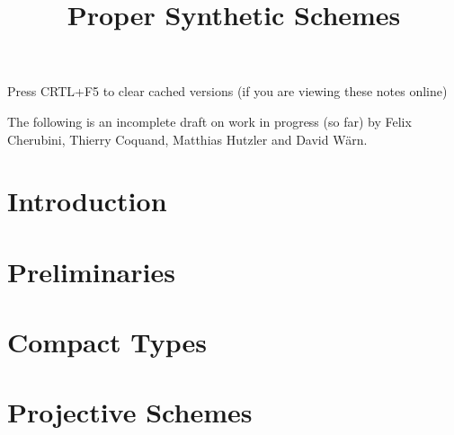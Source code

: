 \documentclass{../util/zariski}
\title{Proper Synthetic Schemes}
\begin{document}
\maketitle

\begin{center}
  \color{purple}
  \large{Press CRTL+F5 to clear cached versions}
  \large{(if you are viewing these notes online)}
\end{center}

The following is an incomplete draft on work in progress (so far)
by Felix Cherubini, Thierry Coquand, Matthias Hutzler and David Wärn.

\tableofcontents


\section*{Introduction}


\section{Preliminaries}


\section{Compact Types}


\section{Projective Schemes}


\printindex

\printbibliography
\end{document}
